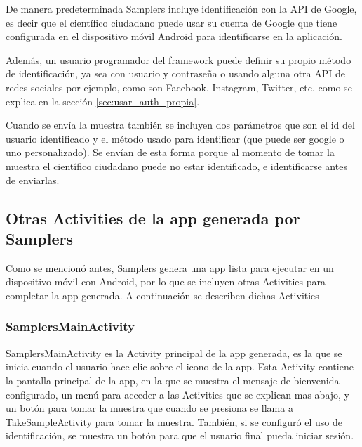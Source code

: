 De manera predeterminada Samplers incluye identificación con la API de Google, es decir que el científico ciudadano puede usar su cuenta de Google que tiene configurada en el dispositivo móvil Android para identificarse en la aplicación.

Además, un usuario programador del framework puede definir su propio método de identificación, ya sea con usuario y contraseña o usando alguna otra API de redes sociales por ejemplo, como son Facebook, Instagram, Twitter, etc. como se explica en la sección \ref{sec:usar_auth_propia}.

Cuando se envía la muestra también se incluyen dos parámetros que son el id del usuario identificado y el método usado para identificar (que puede ser google o uno personalizado). Se envían de esta forma porque al momento de tomar la muestra el científico ciudadano puede no estar identificado, e identificarse antes de enviarlas.

\subsection{Otras Activities de la app generada por Samplers}
Como se mencionó antes, Samplers genera una app lista para ejecutar en un dispositivo móvil con Android, por lo que se incluyen otras Activities para completar la app generada. A continuación se describen dichas Activities

\subsubsection{SamplersMainActivity}
SamplersMainActivity es la Activity principal de la app generada, es la que se inicia cuando el usuario hace clic sobre el icono de la app. Esta Activity contiene la pantalla principal de la app, en la que se muestra el mensaje de bienvenida configurado, un menú para acceder a las Activities que se explican mas abajo, y un botón para tomar la muestra que cuando se presiona se llama a TakeSampleActivity para tomar la muestra. También, si se configuró el uso de identificación, se muestra un botón para que el usuario final pueda iniciar sesión.

